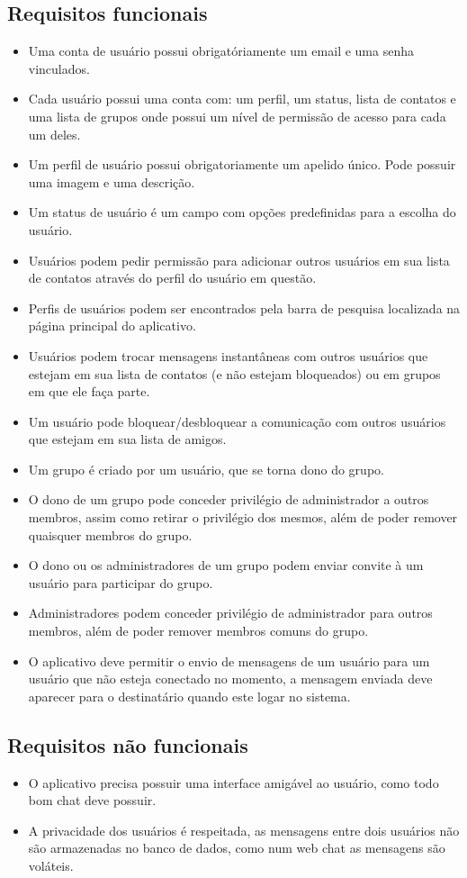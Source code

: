\documentclass[11pt,a4paper,titlepage]{article}
\begin{document}
\subsection{Requisitos funcionais}
\begin{itemize}
\item Uma conta de usuário possui obrigatóriamente um email e uma senha vinculados.
\item Cada usuário possui uma conta com: um perfil, um status, lista de contatos e uma lista de grupos onde possui um nível de permissão de acesso para cada um deles.
\item Um perfil de usuário possui obrigatoriamente um apelido único. Pode possuir uma imagem e uma descrição.
\item Um status de usuário é um campo com opções predefinidas para a escolha do usuário.
\item Usuários podem pedir permissão para adicionar outros usuários em sua lista de contatos através do perfil do usuário em questão.
\item Perfis de usuários podem ser encontrados pela barra de pesquisa localizada na página principal do aplicativo.
\item Usuários podem trocar mensagens instantâneas com outros usuários que estejam em sua lista de contatos (e não estejam bloqueados) ou em grupos em que ele faça parte.
\item Um usuário pode bloquear/desbloquear a comunicação com outros usuários que estejam em sua lista de amigos.
\item Um grupo é criado por um usuário, que se torna dono do grupo.
\item O dono de um grupo pode conceder privilégio de administrador a outros membros, assim como retirar o privilégio dos mesmos, além de poder remover quaisquer membros do grupo.
\item O dono ou os administradores de um grupo podem enviar convite à um usuário para participar do grupo.
\item Administradores podem conceder privilégio de administrador para outros membros, além de poder remover membros comuns do grupo.
\item O aplicativo deve permitir o envio de mensagens de um usuário para um usuário que não esteja conectado no momento, a mensagem enviada deve aparecer para o destinatário quando este logar no sistema.
\end{itemize}
\subsection{Requisitos não funcionais}
\begin{itemize}
\item O aplicativo precisa possuir uma interface amigável ao usuário, como todo bom chat deve possuir.
\item A privacidade dos usuários é respeitada, as mensagens entre dois usuários não são armazenadas no banco de dados, como num web chat as mensagens são voláteis.
\end{itemize}
\end{document}
